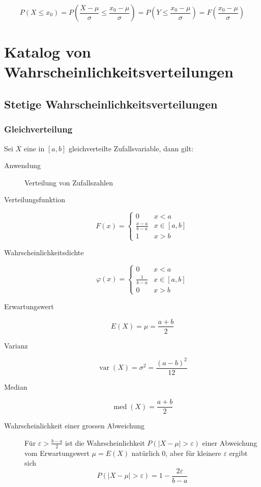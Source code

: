 \[ P(X \leq x_0) = P\left(\frac{X-\mu}{\sigma} \leq \frac{x_0 -
\mu}{\sigma}\right) = P\left(Y \leq \frac{x_0 - \mu}{\sigma}\right) =
F\left(\frac{x_0 - \mu}{\sigma}\right) \]

\section{Katalog von Wahrscheinlichkeitsverteilungen}
\subsection{Stetige Wahrscheinlichkeitsverteilungen}
\subsubsection{Gleichverteilung}
Sei $X$ eine in $[a,b]$ gleichverteilte Zufallsvariable, dann gilt:
\begin{description}
  \item[Anwendung] Verteilung von Zufallszahlen
  \item[Verteilungsfunktion] \[F(x) = \begin{cases} 0 & x < a \\
    \frac{x-a}{b-a} & x \in [a,b] \\ 1 & x > b\end{cases}\]
  \item[Wahrscheinlichkeitsdichte] \[\varphi(x) = \begin{cases} 0 & x < a \\
    \frac{1}{b-a} & x \in [a,b] \\ 0 & x > b\end{cases}\]
  \item[Erwartungswert] \[E(X) = \mu = \frac{a+b}{2}\]
  \item[Varianz] \[\operatorname{var}(X) = \sigma^2 = \frac{(a-b)^2}{12}\]
  \item[Median] \[\operatorname{med}(X) = \frac{a+b}{2}\]
  \item[Wahrscheinlichkeit einer grossen Abweichung] Für $\varepsilon >
  \frac{b-a}{2}$ ist die Wahrscheinlichkeit $P(|X-\mu| > \varepsilon)$
    einer Abweichung vom Erwartungswert $\mu = E(X)$ natürlich 0, aber für
    kleinere $\varepsilon$ ergibt sich
    \[P(|X-\mu| > \varepsilon) = 1 - \frac{2\varepsilon}{b-a}\]
\end{description}
